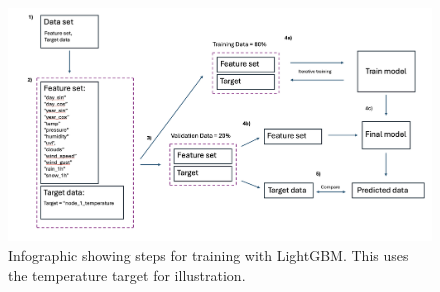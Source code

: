 \begin{figure}[H]
    \centering
    \includegraphics[width=1\textwidth]{contents/part-3/fig3/machine_learning_diagram.png}
    \caption{Infographic showing steps for training with LightGBM. This uses the temperature target for illustration.}
    \label{fig:machine_diagram}
\end{figure}

